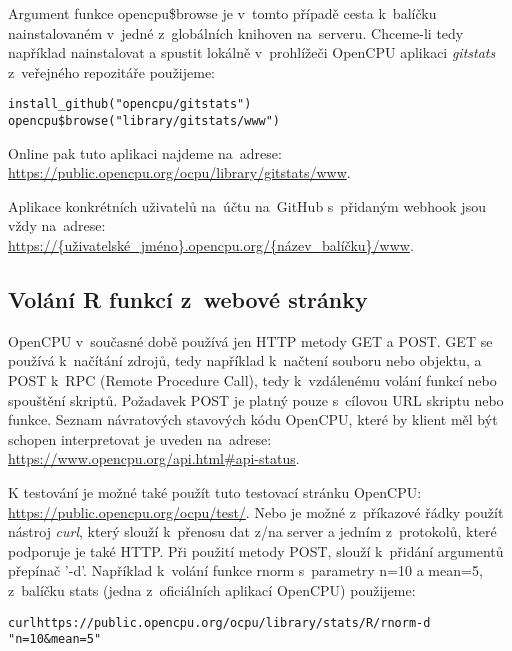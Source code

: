 \documentclass[thesis=B,czech]{FITthesis}[2012/06/26]
\begin{document}
Argument funkce opencpu\$browse je v~tomto případě cesta k~balíčku nainstalovaném v~jedné z~globálních knihoven na~serveru. Chceme-li tedy například nainstalovat a spustit lokálně v~prohlížeči OpenCPU aplikaci \textit{gitstats} z~veřejného repozitáře použijeme:

\begin{alltt}
install_github("opencpu/gitstats")
opencpu\$browse("library/gitstats/www") 
\end{alltt}

\begin{sloppypar}
Online pak tuto aplikaci najdeme na~adrese: \url{https://public.opencpu.org/ocpu/library/gitstats/www}.
\end{sloppypar}

\begin{sloppypar}
Aplikace konkrétních uživatelů na~účtu na~GitHub s~přidaným webhook jsou vždy na~adrese: \url{https://{uživatelské_jméno}.opencpu.org/{název_balíčku}/www}.
\end{sloppypar}

\subsection{Volání R funkcí z~webové stránky}

OpenCPU v~současné době používá jen HTTP metody GET a POST. GET se používá k~načítání zdrojů, tedy například k~načtení souboru nebo objektu, a POST k~RPC (Remote Procedure Call), tedy k~vzdálenému volání funkcí nebo spouštění skriptů. Požadavek POST je platný pouze s~cílovou URL skriptu nebo funkce. Seznam návratových stavových kódu OpenCPU, které by klient měl být schopen interpretovat je uveden na~adrese: \url{https://www.opencpu.org/api.html#api-status}.

\begin{sloppypar}
K testování je možné také použít tuto testovací stránku OpenCPU: \url{https://public.opencpu.org/ocpu/test/}. Nebo je možné z~příkazové řádky použít nástroj \textit{curl}, který slouží k~přenosu dat z/na server a jedním z~protokolů, které podporuje je také HTTP. Při použití metody POST, slouží k~přidání argumentů přepínač '-d'. Například k~volání funkce rnorm s~parametry n=10 a mean=5, z~balíčku stats (jedna z~oficiálních aplikací OpenCPU) použijeme:
\end{sloppypar}

\begin{alltt}
curl https://public.opencpu.org/ocpu/library/stats/R/rnorm -d
"n=10\&mean=5"
\end{alltt}
\end{document}
